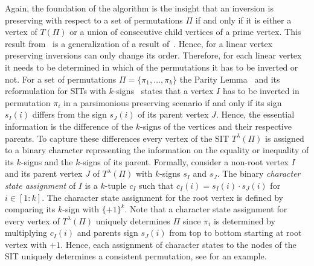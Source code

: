 \documentclass{svmult}
\begin{document}
Again, the foundation of the algorithm is the insight that an inversion is
preserving with respect to a set of permutations $\Pi$ if and only if it is
either a vertex of ${T}(\Pi)$ or a union of consecutive child vertices of
a prime vertex. This result from~\cite{Bernt_2012} is a generalization of a result of~\cite{Berard_2007}. 
Hence, for a linear vertex preserving inversions can only change its order.
Therefore, for each linear vertex it needs to be
determined in which of the permutations it has to be inverted or not.
For a set of permutations $\Pi=\{\pi_1,\ldots,\pi_k\}$ 
the Parity Lemma~\cite{Berard_2007} and its reformulation for SITs with
$k$-signs~\cite{Bernt_2012} states that a vertex $I$ has to be inverted in
permutation $\pi_i$ in a parsimonious preserving scenario if and only if its
sign $s_I(i)$ differs from the sign $s_J(i)$ of its parent vertex $J$.
Hence, the essential information is the difference of the $k$-signs
of the vertices and their respective parents. 
To capture these differences every vertex of the SIT
${T}^\lambda(\Pi)$ is assigned to a binary character representing the
information on the equality or inequality of its $k$-signs and the $k$-signs of
its parent.
Formally, consider a non-root vertex $I$ and its parent vertex $J$ of
${T}^\lambda(\Pi)$ with $k$-signs $s_I$ and $s_J$.
The binary \emph{character state assignment} of $I$ is a 
$k$-tuple $c_I$ such that $c_I(i)=s_I(i)\cdot s_J(i)$ for $i\in[1:k]$.
The character state assignment for the root vertex is defined by comparing its
$k$-sign with $\{+1\}^k$.
Note that a character state assignment for every vertex of ${T}^\lambda(\Pi)$
uniquely determines $\Pi$ since $\pi_i$ is determined by multiplying $c_I(i)$
and parents sign $s_J(i)$ from top to bottom starting at root vertex with $+1$.
Hence, each assignment of character states to the nodes of the SIT uniquely determines a consistent permutation, see
 for an example.
\end{document}
